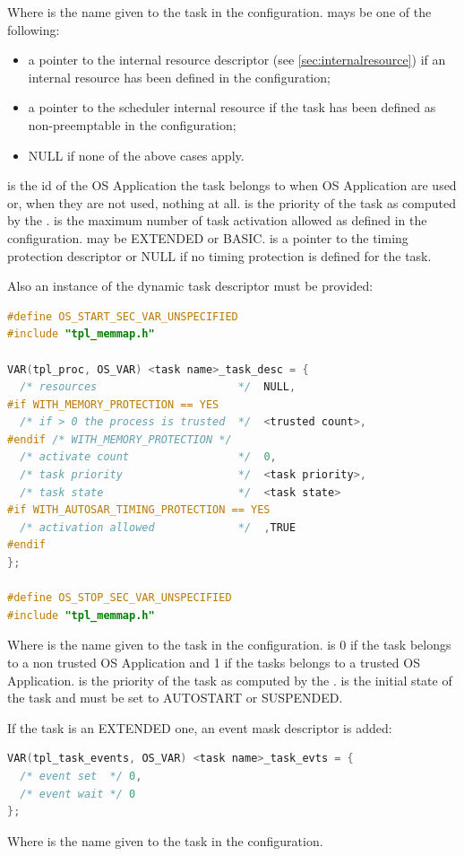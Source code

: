 Where  is the name given to the task in the configuration.  mays be one of the following:

\begin{itemize}
\item a pointer to the internal resource descriptor (see \ref{sec:internalresource}) if an internal resource has been defined in the configuration;
\item a pointer to the scheduler internal resource if the task has been defined as non-preemptable in the configuration;
\item NULL if none of the above cases apply.
\end{itemize}

 is the id of the OS Application the task belongs to when OS Application are used or, when they are not used, nothing at all.  is the priority of the task as computed by the \sysgen.  is the maximum number of task activation allowed as defined in the configuration.  may be EXTENDED or BASIC.  is a pointer to the timing protection descriptor or NULL if no timing protection is defined for the task.

Also an instance of the dynamic task descriptor must be provided:

\begin{lstlisting}[language=C]
#define OS_START_SEC_VAR_UNSPECIFIED
#include "tpl_memmap.h"

VAR(tpl_proc, OS_VAR) <task name>_task_desc = {
  /* resources                      */  NULL,
#if WITH_MEMORY_PROTECTION == YES
  /* if > 0 the process is trusted  */  <trusted count>,    
#endif /* WITH_MEMORY_PROTECTION */
  /* activate count                 */  0,
  /* task priority                  */  <task priority>,
  /* task state                     */  <task state>
#if WITH_AUTOSAR_TIMING_PROTECTION == YES
  /* activation allowed             */  ,TRUE
#endif
};

#define OS_STOP_SEC_VAR_UNSPECIFIED
#include "tpl_memmap.h"
\end{lstlisting}

Where  is the name given to the task in the configuration.  is 0 if the task belongs to a non trusted OS Application and 1 if the tasks belongs to a trusted OS Application.  is the priority of the task as computed by the \sysgen.  is the initial state of the task and must be set to AUTOSTART or SUSPENDED.

If the task is an EXTENDED one, an event mask descriptor is added:


\begin{lstlisting}[language=C]
VAR(tpl_task_events, OS_VAR) <task name>_task_evts = {
  /* event set  */ 0,
  /* event wait */ 0
};
\end{lstlisting}

Where  is the name given to the task in the configuration.

